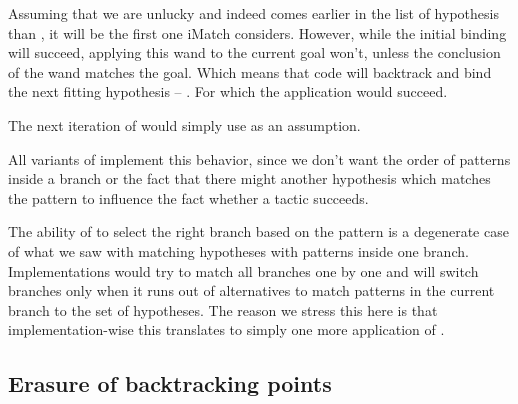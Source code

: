 Assuming that we are unlucky and  indeed comes earlier in the list of hypothesis than , it will be the first one iMatch considers.
However, while the initial binding will succeed, applying this wand to the current goal won't, unless the conclusion of the wand matches the goal.
Which means that code will backtrack and bind the next fitting hypothesis -- .
For which the application would succeed.

The next iteration of  would simply use  as an assumption.

All variants of  implement this behavior, since we don't want the order of patterns inside a branch or the fact that there might another hypothesis which matches the pattern to influence the fact whether a tactic succeeds.

The ability of  to select the right branch based on the pattern is a degenerate case of what we saw with matching hypotheses with patterns inside one branch.
Implementations would try to match all branches one by one and will switch branches only when it runs out of alternatives to match patterns in the current branch to the set of hypotheses.
The reason we stress this here is that implementation-wise this translates to simply one more application of .

\subsection{Erasure of backtracking points}

